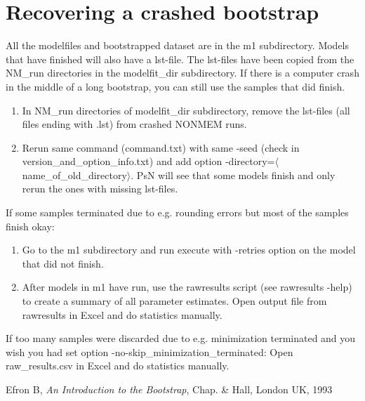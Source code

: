 \section{Recovering a crashed bootstrap}

All the modelfiles and bootstrapped dataset are in the m1 subdirectory. Models that have finished will also have a lst-file. The lst-files have been copied from the NM\_run directories in the modelfit\_dir  subdirectory.  
If there is a computer crash in the middle of a long bootstrap, you can still use the samples that did finish. 
\begin{enumerate}
	\item In NM\_run directories of modelfit\_dir subdirectory, remove the lst-files (all files ending with .lst) from crashed NONMEM runs.
	\item Rerun same command (command.txt) with same -seed (check in version\_and\_option\_info.txt) and add option -directory=$\langle$name\_of\_old\_directory$\rangle$. PsN will see that some models finish and only rerun the ones with missing lst-files. 
\end{enumerate}
If some samples terminated due to e.g. rounding errors but most of the samples finish okay: 
\begin{enumerate}
	\item Go to the m1 subdirectory and run execute with -retries option on the model that did not finish. 
	\item After models in m1 have run, use the rawresults script (see rawresults -help) to create a summary of all parameter estimates. Open output file from rawresults in Excel and do statistics manually. 
\end{enumerate}
If too many samples were discarded due to e.g. minimization terminated and you wish you had set  option -no-skip\_minimization\_terminated: Open raw\_results.csv in Excel and do statistics manually. 


\begin{thebibliography}{1}
 Efron B, {\em An Introduction to the Bootstrap}, Chap. \& Hall, London UK, 1993
\end{thebibliography}


